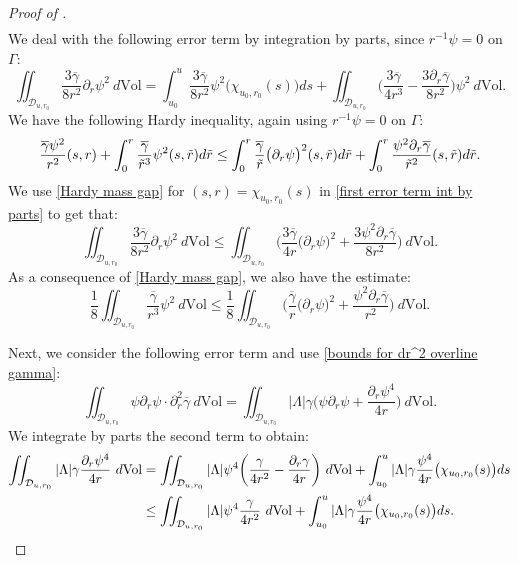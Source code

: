 \documentclass[11pt]{article}
\numberwithin{equation}{section}
\begin{document}
\begin{proof}[Proof of ]
\begin{align}
    \end{align}
    We deal with the following error term by integration by parts, since $r^{-1}\psi=0$ on $\Gamma$:
    \begin{equation}\label{first error term int by parts}
        \iint_{\mathcal{D}_{u,r_0}}\frac{3\overline{\gamma}}{8r^2}\partial_r\psi^2\ d\mathrm{Vol}=\int_{u_0}^u\frac{3\overline{\gamma}}{8r^2}\psi^2\big(\chi_{u_0,r_0}(s)\big)ds+\iint_{\mathcal{D}_{u,r_0}}\bigg(\frac{3\overline{\gamma}}{4r^3}-\frac{3\partial_r\overline{\gamma}}{8r^2}\bigg)\psi^2\ d\mathrm{Vol}.
    \end{equation}
    We have the following Hardy inequality, again using $r^{-1}\psi=0$ on $\Gamma$:
    \begin{equation}\label{Hardy mass gap}
        \frac{\overline{\gamma}\psi^2}{r^2}(s,r)+\int_0^r\frac{\overline{\gamma}}{\Tilde{r}^3}\psi^2(s,\Tilde{r})d\Tilde{r}\leq\int_0^r\frac{\overline{\gamma}}{\Tilde{r}}\big(\partial_r\psi\big)^2(s,\Tilde{r})d\Tilde{r}+\int_0^r\frac{\psi^2\partial_r\overline{\gamma}}{\Tilde{r}^2}(s,\Tilde{r})d\Tilde{r}.
    \end{equation}
    We use \eqref{Hardy mass gap} for $(s,r)=\chi_{u_0,r_0}(s)$ in \eqref{first error term int by parts} to get that:
    \begin{equation}\label{first error term bound}
        \iint_{\mathcal{D}_{u,r_0}}\frac{3\overline{\gamma}}{8r^2}\partial_r\psi^2\ d\mathrm{Vol}\leq\iint_{\mathcal{D}_{u,r_0}}\bigg(\frac{3\overline{\gamma}}{4r}\big(\partial_r\psi\big)^2+\frac{3\psi^2\partial_r\overline{\gamma}}{8r^2}\bigg)\ d\mathrm{Vol}.
    \end{equation}
    As a consequence of \eqref{Hardy mass gap}, we also have the estimate:
    \begin{equation}\label{one more error term bound}
        \frac{1}{8}\iint_{\mathcal{D}_{u,r_0}}\frac{\overline{\gamma}}{r^3}\psi^2\ d\mathrm{Vol}\leq\frac{1}{8}\iint_{\mathcal{D}_{u,r_0}}\bigg(\frac{\overline{\gamma}}{r}\big(\partial_r\psi\big)^2+\frac{\psi^2\partial_r\overline{\gamma}}{r^2}\bigg)\ d\mathrm{Vol}.
    \end{equation}

    Next, we consider the following error term and use \eqref{bounds for dr^2 overline gamma}:
    \[\iint_{\mathcal{D}_{u,r_0}}\psi\partial_r\psi\cdot\partial_r^2\overline{\gamma}\ d\mathrm{Vol}=\iint_{\mathcal{D}_{u,r_0}}|\Lambda|\gamma\bigg(\psi\partial_r\psi+\frac{\partial_r\psi^4}{4r}\bigg)\ d\mathrm{Vol}.\]
We integrate by parts the second term to obtain:
\begin{align}
    \iint_{\mathcal{D}_{u,r_0}}|\Lambda|\gamma\frac{\partial_r\psi^4}{4r}\ d\mathrm{Vol}&=\iint_{\mathcal{D}_{u,r_0}}|\Lambda|\psi^4\bigg(\frac{\gamma}{4r^2}-\frac{\partial_r\gamma}{4r}\bigg)\ d\mathrm{Vol}+\int_{u_0}^u|\Lambda|\gamma\frac{\psi^4}{4r}\big(\chi_{u_0,r_0}(s)\big)ds\label{second error term bound}\\
    &\leq\iint_{\mathcal{D}_{u,r_0}}|\Lambda|\psi^4\frac{\gamma}{4r^2}\ d\mathrm{Vol}+\int_{u_0}^u|\Lambda|\gamma\frac{\psi^4}{4r}\big(\chi_{u_0,r_0}(s)\big)ds.\notag
\end{align}


\end{proof}
\end{document}

